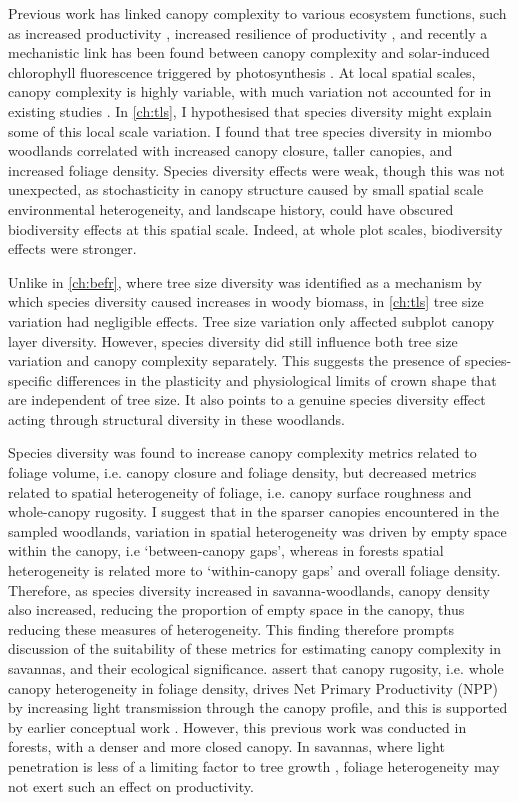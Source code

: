 \begin{refsection}
Previous work has linked canopy complexity to various ecosystem functions, such as increased productivity \citep{Gough2019, Hardiman2011}, increased resilience of productivity \citep{Pretzsch2014}, and recently a mechanistic link has been found between canopy complexity and solar-induced chlorophyll fluorescence triggered by photosynthesis \citep{Regaieg2021}. At local spatial scales, canopy complexity is highly variable, with much variation not accounted for in existing studies \citep{Guan2014}. In \autoref{ch:tls}, I hypothesised that species diversity might explain some of this local scale variation. I found that tree species diversity in miombo woodlands correlated with increased canopy closure, taller canopies, and increased foliage density. Species diversity effects were weak, though this was not unexpected, as stochasticity in canopy structure caused by small spatial scale environmental heterogeneity, and landscape history, could have obscured biodiversity effects at this spatial scale. Indeed, at whole plot scales, biodiversity effects were stronger.

Unlike in \autoref{ch:befr}, where tree size diversity was identified as a mechanism by which species diversity caused increases in woody biomass, in \autoref{ch:tls} tree size variation had negligible effects. Tree size variation only affected subplot canopy layer diversity. However, species diversity did still influence both tree size variation and canopy complexity separately. This suggests the presence of species-specific differences in the plasticity and physiological limits of crown shape that are independent of tree size. It also points to a genuine species diversity effect acting through structural diversity in these woodlands.

Species diversity was found to increase canopy complexity metrics related to foliage volume, i.e. canopy closure and foliage density, but decreased metrics related to spatial heterogeneity of foliage, i.e. canopy surface roughness and whole-canopy rugosity. I suggest that in the sparser canopies encountered in the sampled woodlands, variation in spatial heterogeneity was driven by empty space within the canopy, i.e `between-canopy gaps', whereas in forests spatial heterogeneity is related more to `within-canopy gaps' and overall foliage density. Therefore, as species diversity increased in savanna-woodlands, canopy density also increased, reducing the proportion of empty space in the canopy, thus reducing these measures of heterogeneity. This finding therefore prompts discussion of the suitability of these metrics for estimating canopy complexity in savannas, and their ecological significance. \citet{Hardiman2011} assert that canopy rugosity, i.e. whole canopy heterogeneity in foliage density, drives Net Primary Productivity (NPP) by increasing light transmission through the canopy profile, and this is supported by earlier conceptual work \citep{Horn1971}. However, this previous work was conducted in forests, with a denser and more closed canopy. In savannas, where light penetration is less of a limiting factor to tree growth \citep{Frost1996}, foliage heterogeneity may not exert such an effect on productivity. 


\end{refsection}
